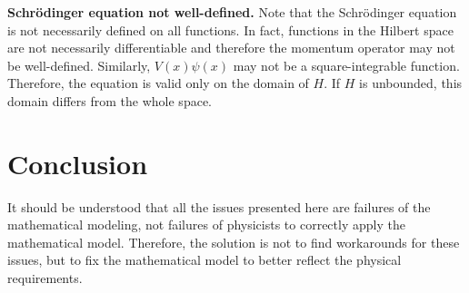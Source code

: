 \documentclass{techbrief}
\begin{document}
\textbf{Schrödinger equation not well-defined.} Note that the Schrödinger equation is not necessarily defined on all functions. In fact, functions in the Hilbert space are not necessarily differentiable and therefore the momentum operator may not be well-defined. Similarly, $V(x) \psi(x)$ may not be a square-integrable function. Therefore, the equation is valid only on the domain of $H$. If $H$ is unbounded, this domain differs from the whole space.

\section{Conclusion}

It should be understood that all the issues presented here are failures of the mathematical modeling, not failures of physicists to correctly apply the mathematical model. Therefore, the solution is not to find workarounds for these issues, but to fix the mathematical model to better reflect the physical requirements.
\end{document}
